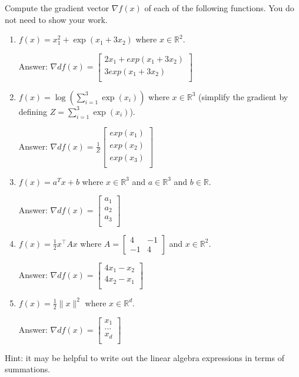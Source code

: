 \documentclass{article}
\newcommand{\blu}[1]{{\textcolor{blu}{#1}}}
\newcommand{\gre}[1]{\textcolor{gre}{#1}}
\newcommand\ans[1]{\par\gre{Answer: #1}}
\let\ask\blu
\def\R{\mathbb{R}}
\newcommand{\norm}[1]{\lVert #1 \rVert}
\begin{document}
  \ask{Compute the gradient vector $\nabla f(x)$ of each of the following functions.} You do not need to show your work.
  \begin{enumerate}
  \item $f(x) = x_1^2 + \exp(x_1 + 3x_2)$ where $x \in \R^2$.
   \ans{$\nabla df(x) = \left[\begin{array}{c}2x_1+exp(x_1+3x_2)\\3exp(x_1 + 3x_2)\\\end{array}\right]$}
  \item $f(x) = \log\left(\sum_{i=1}^3\exp(x_i)\right)$ where $x \in \R^3$ (simplify the gradient by defining $Z = \sum_{i=1}^3\exp(x_i)$).
   \ans{$\nabla df(x) = \frac{1}{Z}\left[\begin{array}{c}exp(x_1)\\exp(x_2)\\exp(x_3)\\\end{array}\right]$}
  \item $f(x) = a^Tx + b$ where $x \in \R^3$ and $a \in \R^3$ and $b \in \R$.
   \ans{$\nabla df(x) = \left[\begin{array}{c}a_1\\a_2\\a_3\\\end{array}\right]$}
  \item $f(x) = \frac12 x^\top A x$ where $A=\left[ \begin{array}{cc}
  4 & -1 \\
  -1 & 4 \end{array} \right]$ and $x \in \mathbb{R}^2$.
   \ans{$\nabla df(x) = \left[\begin{array}{c}4x_1-x_2\\4x_2-x_1\\\end{array}\right]$}
  \item $f(x) = \frac{1}{2}\norm{x}^2$ where $x \in \R^d$.
   \ans{$\nabla df(x) = \left[\begin{array}{c}x_1\\...\\x_d\\\end{array}\right]$}
  \end{enumerate}

  Hint: it may be helpful to write out the linear algebra expressions in terms of summations.
  \newpage
\end{document}
